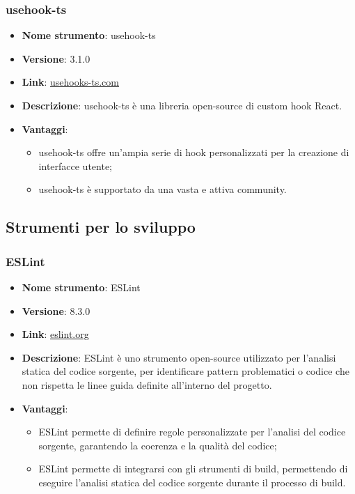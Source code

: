 \subsubsection{usehook-ts}
\begin{itemize}
      \item \textbf{Nome strumento}: usehook-ts
      \item \textbf{Versione}: 3.1.0
      \item \textbf{Link}: \href{https://usehooks-ts.com/}{usehooks-ts.com}
      \item \textbf{Descrizione}: usehook-ts è una libreria open-source di custom hook React.
      \item \textbf{Vantaggi}:
            \begin{itemize}
                  \item usehook-ts offre un'ampia serie di hook personalizzati per la creazione di interfacce utente;
                  \item usehook-ts è supportato da una vasta e attiva community.
            \end{itemize}
\end{itemize}

\subsection{Strumenti per lo sviluppo}

\subsubsection{ESLint}
\begin{itemize}
      \item \textbf{Nome strumento}: ESLint
      \item \textbf{Versione}: 8.3.0
      \item \textbf{Link}: \href{https://eslint.org/}{eslint.org}
      \item \textbf{Descrizione}: ESLint è uno strumento open-source utilizzato per l'analisi statica del codice sorgente, per identificare pattern problematici o codice che non rispetta
            le linee guida definite all'interno del progetto.
      \item \textbf{Vantaggi}:
            \begin{itemize}
                  \item ESLint permette di definire regole personalizzate per l'analisi del codice sorgente, garantendo la coerenza e la qualità del codice;
                  \item ESLint permette di integrarsi con gli strumenti di build, permettendo di eseguire l'analisi statica del codice sorgente durante il processo di build.
            \end{itemize}
\end{itemize}

